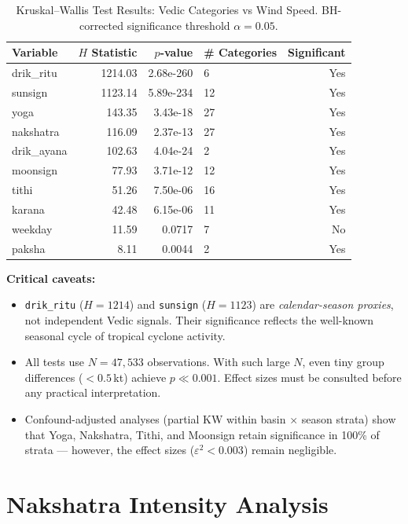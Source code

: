 \documentclass[11pt,a4paper]{article}
\begin{document}
\begin{table}[H]
  \centering
  \caption{Kruskal--Wallis Test Results: Vedic Categories vs Wind Speed.
           BH-corrected significance threshold $\alpha = 0.05$.}
  \label{tab:kw}
  \begin{tabular}{lrrl r}
    \toprule
    Variable & $H$ Statistic & $p$-value & \# Categories & Significant \\
    \midrule
  drik\_ritu & 1214.03 & 2.68e-260 & 6 & Yes \\
  sunsign & 1123.14 & 5.89e-234 & 12 & Yes \\
  yoga & 143.35 & 3.43e-18 & 27 & Yes \\
  nakshatra & 116.09 & 2.37e-13 & 27 & Yes \\
  drik\_ayana & 102.63 & 4.04e-24 & 2 & Yes \\
  moonsign & 77.93 & 3.71e-12 & 12 & Yes \\
  tithi & 51.26 & 7.50e-06 & 16 & Yes \\
  karana & 42.48 & 6.15e-06 & 11 & Yes \\
  weekday & 11.59 & 0.0717 & 7 & No \\
  paksha & 8.11 & 0.0044 & 2 & Yes \\
    \bottomrule
  \end{tabular}
\end{table}

\medskip
\noindent\textbf{Critical caveats:}
\begin{itemize}[noitemsep]
  \item \texttt{drik\_ritu} ($H=1214$) and \texttt{sunsign} ($H=1123$) are \emph{calendar-season
        proxies}, not independent Vedic signals. Their significance reflects the well-known
        seasonal cycle of tropical cyclone activity.
  \item All tests use $N = 47,533$ observations. With such large $N$,
        even tiny group differences ($<0.5$\,kt) achieve $p \ll 0.001$. Effect sizes must
        be consulted before any practical interpretation.
  \item Confound-adjusted analyses (partial KW within basin $\times$ season strata) show
        that Yoga, Nakshatra, Tithi, and Moonsign retain significance in 100\% of strata ---
        however, the effect sizes ($\varepsilon^2 < 0.003$) remain negligible.
\end{itemize}

\section{Nakshatra Intensity Analysis}
\end{document}
